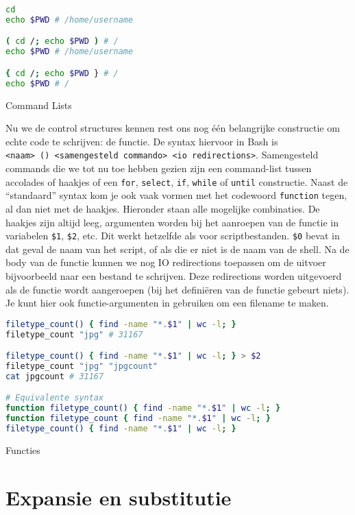 \begin{listing}
\begin{lstlisting}[language=bash]
cd
echo $PWD # /home/username

( cd /; echo $PWD ) # /
echo $PWD # /home/username

{ cd /; echo $PWD } # /
echo $PWD # /
\end{lstlisting}
\caption{Command Lists}
\end{listing}

Nu we de control structures kennen rest ons nog één belangrijke constructie om echte code te schrijven: de functie. De syntax hiervoor in Bash is \texttt{\textless{}naam\textgreater{}\ ()\ \textless{}samengesteld\ commando\textgreater{}\ \textless{}io\ redirections\textgreater{}}. Samengesteld commands die we tot nu toe hebben gezien zijn een command-list tussen accolades of haakjes of een \texttt{for}, \texttt{select}, \texttt{if}, \texttt{while} of \texttt{until} constructie. Naast de ``standaard'' syntax kom je ook vaak vormen met het codewoord \texttt{function} tegen, al dan niet met de haakjes. Hieronder staan alle mogelijke combinaties. De haakjes zijn altijd leeg, argumenten worden bij het aanroepen van de functie in variabelen \texttt{\$1}, \texttt{\$2}, etc. Dit werkt hetzelfde als voor scriptbestanden. \texttt{\$0} bevat in dat geval de naam van het script, of als die er niet is de naam van de shell. Na de body van de functie kunnen we nog IO redirections toepassen om de uitvoer bijvoorbeeld naar een bestand te schrijven. Deze redirections worden uitgevoerd als de functie wordt aangeroepen (bij het definiëren van de functie gebeurt niets). Je kunt hier ook functie-argumenten in gebruiken om een filename te maken.

\begin{listing}
\begin{lstlisting}[language=bash]
filetype_count() { find -name "*.$1" | wc -l; }
filetype_count "jpg" # 31167

filetype_count() { find -name "*.$1" | wc -l; } > $2
filetype_count "jpg" "jpgcount"
cat jpgcount # 31167

# Equivalente syntax
function filetype_count() { find -name "*.$1" | wc -l; }
function filetype_count { find -name "*.$1" | wc -l; }
filetype_count() { find -name "*.$1" | wc -l; }
\end{lstlisting}
\caption{Functies}
\end{listing}

\section{Expansie en substitutie}\label{expansie-en-substitutie}

